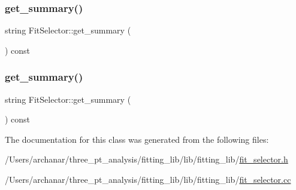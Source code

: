 \subsubsection{\texorpdfstring{get\_summary()}{get\_summary()}\hspace{0.1cm}{\footnotesize\ttfamily [1/2]}}
{\footnotesize\ttfamily string Fit\+Selector\+::get\+\_\+summary (\begin{DoxyParamCaption}{ }\end{DoxyParamCaption}) const\hspace{0.3cm}{\ttfamily [inline]}}

\mbox{\label{classFitSelector_adaeea09e76449a7210518347f40a80d5}} 
\subsubsection{\texorpdfstring{get\_summary()}{get\_summary()}\hspace{0.1cm}{\footnotesize\ttfamily [2/2]}}
{\footnotesize\ttfamily string Fit\+Selector\+::get\+\_\+summary (\begin{DoxyParamCaption}{ }\end{DoxyParamCaption}) const\hspace{0.3cm}{\ttfamily [inline]}}



The documentation for this class was generated from the following files\+:\begin{DoxyCompactItemize}
\item 
/\+Users/archanar/three\+\_\+pt\+\_\+analysis/fitting\+\_\+lib/lib/fitting\+\_\+lib/\mbox{\hyperlink{lib_2fitting__lib_2fit__selector_8h}{fit\+\_\+selector.\+h}}\item 
/\+Users/archanar/three\+\_\+pt\+\_\+analysis/fitting\+\_\+lib/lib/fitting\+\_\+lib/\mbox{\hyperlink{fit__selector_8cc}{fit\+\_\+selector.\+cc}}\end{DoxyCompactItemize}
